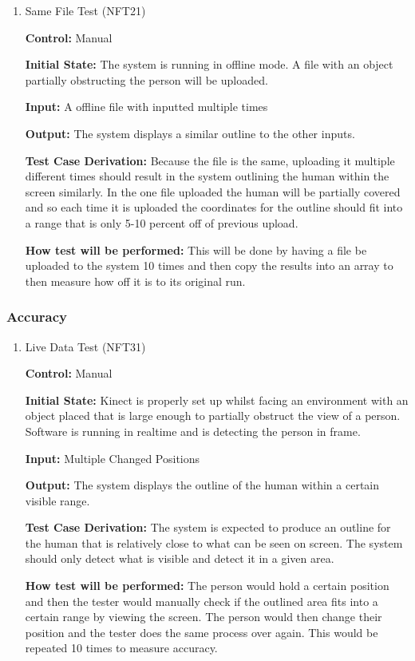 \documentclass[12pt, titlepage]{article}
\begin{document}
\begin{enumerate}

\item{Same File Test (NFT21)\label{NFT21}\\}
  
\textbf{Control:} Manual

\textbf{Initial State:} The system is running in offline mode. A file with an object partially obstructing the person will be uploaded.

\textbf{Input:} A offline file with inputted multiple times

\textbf{Output:} The system displays a similar outline to the other inputs.

\textbf{Test Case Derivation:} Because the file is the same, uploading it multiple different times should result in the system outlining the human within the screen similarly. In the one file uploaded the human will be partially covered and so each time it is uploaded the coordinates for the outline should fit into a range that is only 5-10 percent off of previous upload.

\textbf{How test will be performed:} This will be done by having a file be uploaded to the system 10 times and then copy the results into an array to then measure how off it is to its original run. 
  
\end{enumerate}

\subsubsection{Accuracy}

\begin{enumerate}

\item{Live Data Test (NFT31)\label{NFT31}\\}

\textbf{Control:} Manual

\textbf{Initial State:} Kinect is properly set up whilst facing an environment with an object placed that is large enough to partially obstruct the view of a person. Software is running in realtime and is detecting the person in frame.

\textbf{Input:} Multiple Changed Positions

\textbf{Output:} The system displays the outline of the human within a certain visible range.

\textbf{Test Case Derivation:} The system is expected to produce an outline for the human that is relatively close to what can be seen on screen. The system should only detect what is visible and detect it in a given area.

\textbf{How test will be performed:} The person would hold a certain position and then the tester would manually check if the outlined area fits into a certain range by viewing the screen. The person would then change their position and the tester does the same process over again. This would be repeated 10 times to measure accuracy.
  
\end{enumerate}
\end{document}
